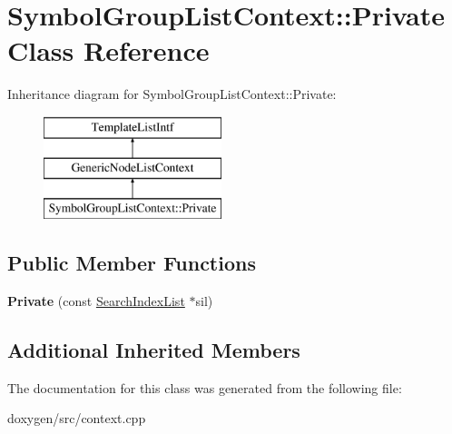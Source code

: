 \hypertarget{class_symbol_group_list_context_1_1_private}{}\section{Symbol\+Group\+List\+Context\+::Private Class Reference}
\label{class_symbol_group_list_context_1_1_private}
Inheritance diagram for Symbol\+Group\+List\+Context\+::Private\+:\begin{figure}[H]
\begin{center}
\leavevmode
\includegraphics[height=3.000000cm]{class_symbol_group_list_context_1_1_private}
\end{center}
\end{figure}
\subsection*{Public Member Functions}
\begin{DoxyCompactItemize}
\item 
\mbox{\label{class_symbol_group_list_context_1_1_private_a7049247c4a109e44c8ef045b2fd79280}} 
{\bfseries Private} (const \mbox{\hyperlink{class_search_index_list}{Search\+Index\+List}} $\ast$sil)
\end{DoxyCompactItemize}
\subsection*{Additional Inherited Members}


The documentation for this class was generated from the following file\+:\begin{DoxyCompactItemize}
\item 
doxygen/src/context.\+cpp\end{DoxyCompactItemize}
